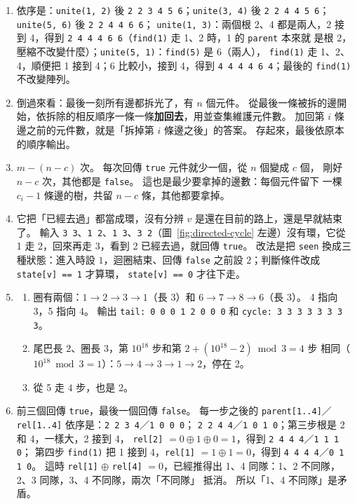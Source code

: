 \begin{enumerate}
\item 依序是：\texttt{unite(1, 2)} 後 \texttt{2 2 3 4 5 6}；\texttt{unite(3, 4)}
後 \texttt{2 2 4 4 5 6}；\texttt{unite(5, 6)} 後 \texttt{2 2 4 4 6 6}；
\texttt{unite(1, 3)}：兩個根 2、4 都是兩人，2 接到 4，得到
\texttt{2 4 4 4 6 6}（\texttt{find(1)} 走 1、2 時，1 的 \texttt{parent} 本來就
是根 2，壓縮不改變什麼）；\texttt{unite(5, 1)}：\texttt{find(5)} 是 6（兩人），
\texttt{find(1)} 走 1、2、4，順便把 1 接到 4；6 比較小，接到 4，得到
\texttt{4 4 4 4 6 4}；最後的 \texttt{find(1)} 不改變陣列。

\item 倒過來看：最後一刻所有邊都拆光了，有 $n$ 個元件。 從最後一條被拆的邊開
始，依拆除的相反順序一條一條\textbf{加回去}，用並查集維護元件數。 加回第 $i$ 條
邊之前的元件數，就是「拆掉第 $i$ 條邊之後」的答案。 存起來，最後依原本的順序輸出。

\item $m - (n - c)$ 次。 每次回傳 \texttt{true} 元件就少一個，從 $n$ 個變成 $c$ 個，
剛好 $n - c$ 次，其他都是 \texttt{false}。 這也是最少要拿掉的邊數：每個元件留下
一棵 $c_i - 1$ 條邊的樹，共留 $n - c$ 條，其他都要拿掉。

\item 它把「已經去過」都當成環，沒有分辨 $v$ 是還在目前的路上，還是早就結束了。
輸入 \texttt{3 3}、\texttt{1 2}、\texttt{1 3}、\texttt{3 2}（圖~\ref{fig:directed-cycle}
左邊）沒有環，它從 1 走 2，回來再走 3，看到 2 已經去過，就回傳 \texttt{true}。
改法是把 \texttt{seen} 換成三種狀態：進入時設 $1$，迴圈結束、回傳
\texttt{false} 之前設 $2$；判斷條件改成 \texttt{state[v] == 1} 才算環，
\texttt{state[v] == 0} 才往下走。

\item
\begin{enumerate}
\item 圈有兩個：$1 \to 2 \to 3 \to 1$（長 $3$）和 $6 \to 7 \to 8 \to 6$（長 $3$）。
4 指向 3，5 指向 4。 輸出
\texttt{tail: 0 0 0 1 2 0 0 0} 和 \texttt{cycle: 3 3 3 3 3 3 3 3}。
\item 尾巴長 $2$、圈長 $3$，第 $10^{18}$ 步和第 $2 + (10^{18} - 2) \bmod 3 = 4$ 步
相同（$10^{18} \bmod 3 = 1$）：$5 \to 4 \to 3 \to 1 \to 2$，停在 2。
\item 從 5 走 $4$ 步，也是 2。
\end{enumerate}

\item 前三個回傳 \texttt{true}，最後一個回傳 \texttt{false}。 每一步之後的
\texttt{parent[1..4]}／\texttt{rel[1..4]} 依序是：\texttt{2 2 3 4}／\texttt{1 0 0 0}；
\texttt{2 2 4 4}／\texttt{1 0 1 0}；第三步根是 2 和 4，一樣大，2 接到 4，
\texttt{rel[2]} $= 0 \oplus 1 \oplus 0 = 1$，得到 \texttt{2 4 4 4}／\texttt{1 1 1 0}；
第四步 \texttt{find(1)} 把 1 接到 4，\texttt{rel[1]} $= 1 \oplus 1 = 0$，得到
\texttt{4 4 4 4}／\texttt{0 1 1 0}。 這時 \texttt{rel[1]} $\oplus$ \texttt{rel[4]}
$= 0$，已經推得出 1、4 同隊：1、2 不同隊，2、3 同隊，3、4 不同隊，兩次「不同隊」
抵消。 所以「1、4 不同隊」是矛盾。


\end{enumerate}
